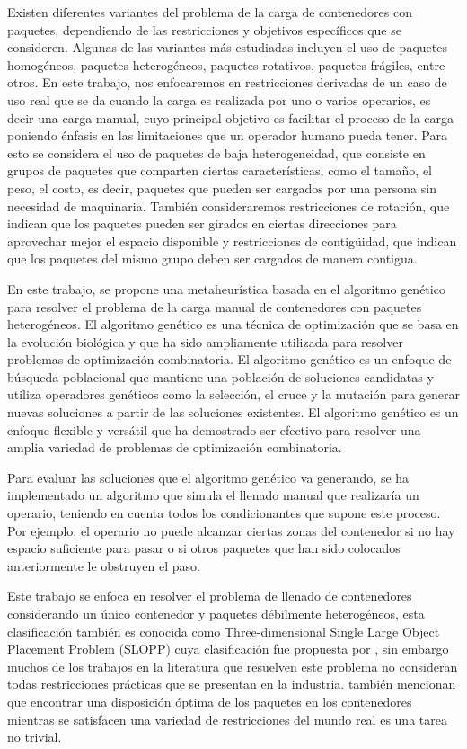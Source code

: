 Existen diferentes variantes del problema de la carga de contenedores con paquetes, dependiendo de las restricciones y objetivos específicos que se consideren. Algunas de las variantes más estudiadas incluyen el uso de paquetes homogéneos, paquetes heterogéneos, paquetes rotativos, paquetes frágiles, entre otros. En este trabajo, nos enfocaremos en restricciones derivadas de un caso de uso real que se da cuando la carga es realizada por uno o varios operarios, es decir una carga manual, cuyo principal objetivo es facilitar el proceso de la carga poniendo énfasis en las limitaciones que un operador humano pueda tener. Para esto se considera el uso de paquetes de baja heterogeneidad, que consiste en grupos de paquetes que comparten ciertas características, como el tamaño, el peso, el costo, es decir, paquetes que pueden ser cargados por una persona sin necesidad de maquinaria. También consideraremos restricciones de rotación, que indican que los paquetes pueden ser girados en ciertas direcciones para aprovechar mejor el espacio disponible y restricciones de contigüidad, que indican que los paquetes del mismo grupo deben ser cargados de manera contigua.

En este trabajo, se propone una metaheurística basada en el algoritmo genético para resolver el problema de la carga manual de contenedores con paquetes heterogéneos. El algoritmo genético es una técnica de optimización que se basa en la evolución biológica y que ha sido ampliamente utilizada para resolver problemas de optimización combinatoria. El algoritmo genético es un enfoque de búsqueda poblacional que mantiene una población de soluciones candidatas y utiliza operadores genéticos como la selección, el cruce y la mutación para generar nuevas soluciones a partir de las soluciones existentes. El algoritmo genético es un enfoque flexible y versátil que ha demostrado ser efectivo para resolver una amplia variedad de problemas de optimización combinatoria.

Para evaluar las soluciones que el algoritmo genético va generando, se ha implementado un algoritmo que simula el llenado manual que realizaría un operario, teniendo en cuenta todos los condicionantes que supone este proceso. Por ejemplo, el operario no puede alcanzar ciertas zonas del contenedor si no hay espacio suficiente para pasar o si otros paquetes que han sido colocados anteriormente le obstruyen el paso.

Este trabajo se enfoca en resolver el problema de llenado de contenedores considerando un único contenedor y paquetes débilmente heterogéneos, esta clasificación también es conocida como Three-dimensional Single Large Object Placement Problem (SLOPP) cuya clasificación fue propuesta por \textcite{WASCHER20071109}, sin embargo muchos de los trabajos en la literatura que resuelven este problema no consideran todas restricciones prácticas que se presentan en la industria. \parencite{SAFAK2023106199} también mencionan que encontrar una disposición óptima de los paquetes en los contenedores mientras se satisfacen una variedad de restricciones del mundo real es una tarea no trivial.

